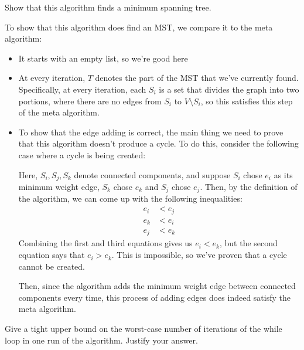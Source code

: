 \documentclass[11pt]{article}
\begin{document}
\begin{subparts}
\subpart Show that this algorithm finds a minimum spanning tree.

\begin{solution}
	To show that this algorithm does find an MST, we compare it to the meta algorithm:
	\begin{itemize}
		\item It starts with an empty list, so we're good here
		\item At every iteration, $T$ denotes the part of the MST that we've currently found. Specifically, 
			at every iteration, each $S_i$ is a set that divides the graph into two portions, where 
			there are no edges from $S_i$ to $V \setminus S_i$, so this satisfies this 
			step of the meta algorithm.
		\item To show that the edge adding is correct, the main thing we need to prove that this algorithm doesn't 
			produce a cycle. To do this, consider the following case where a cycle is being created:
			\begin{center}
			\end{center}
			Here, $S_i, S_j, S_k$ denote connected components, and suppose $S_i$ chose $e_i$ as its 
			minimum weight edge, $S_k$ chose $e_k$ and $S_j$ chose $e_j$. Then, by the definition of the 
			algorithm, we can come up with the following inequalities:
			\begin{align*}
				e_i &< e_j\\
				e_k &< e_i \\
				e_j &< e_k
			\end{align*}
			Combining the first and third equations gives us $e_i < e_k$, but the second equation says that 
			$e_i > e_k$. This is impossible, so we've proven that a cycle cannot be created.

			Then, since the algorithm adds the minimum weight edge between connected components every time, this 
			process of adding edges does indeed satisfy the meta algorithm. 
	\end{itemize}
\end{solution}
\subpart Give a tight upper bound on the worst-case number of iterations of the while loop in one run of the algorithm. Justify your answer. 


\end{subparts}
\end{document}
